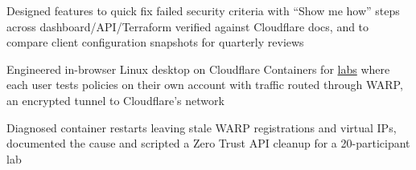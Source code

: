 \documentclass[a4paper,10pt]{article}
\newcommand{\resumeItem}[1]{\item #1}
\begin{document}
            \resumeItem{Designed features to quick fix failed security criteria with ``Show me how'' steps across dashboard/API/Terraform verified against Cloudflare docs, and to compare client configuration snapshots for quarterly reviews}

            \resumeItem{Engineered in-browser Linux desktop on Cloudflare Containers for \href{https://blazehack.com/}{labs} where each user tests policies on their own account with traffic routed through WARP, an encrypted tunnel to Cloudflare's network}

            \resumeItem{Diagnosed container restarts leaving stale WARP registrations and virtual IPs, documented the cause and scripted a Zero Trust API cleanup for a 20-participant lab}
\end{document}
